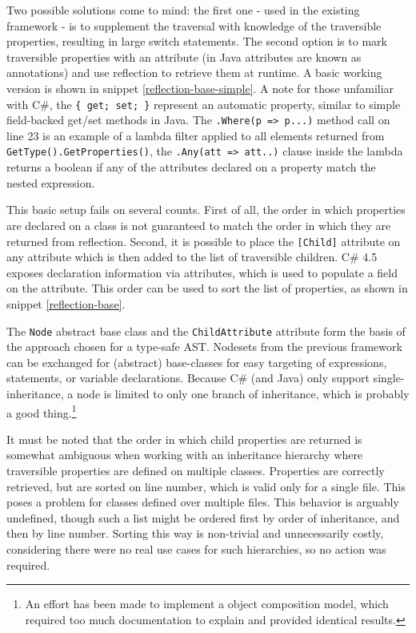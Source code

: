 \documentclass[twoside,openright]{uva-bachelor-thesis}
\newcommand{\code}[1]{\texttt{\footnotesize#1}}
\begin{document}
		Two possible solutions come to mind: the first one - used in the existing framework - is to supplement the traversal with knowledge of the traversible properties, resulting in large switch statements. The second option is to mark traversible properties with an attribute (in Java attributes are known as annotations) and use reflection to retrieve them at runtime. A basic working version is shown in snippet \ref{reflection-base-simple}. A note for those unfamiliar with C\#, the \code{\{ get; set; \}} represent an automatic property, similar to simple field-backed get/set methods in Java. The \code{.Where(p => p...)} method call on line 23 is an example of a lambda filter applied to all elements returned from \code{GetType().GetProperties()}, the \code{.Any(att => att..)} clause inside the lambda returns a boolean if any of the attributes declared on a property match the nested expression.
			
		This basic setup fails on several counts. First of all, the order in which properties are declared on a class is not guaranteed to match the order in which they are returned from reflection. Second, it is possible to place the \code{[Child]} attribute on any attribute which is then added to the list of traversible children. C\# 4.5 exposes declaration information via attributes, which is used to populate a field on the attribute. This order can be used to sort the list of properties, as shown in snippet \ref{reflection-base}.
				
		The \code{Node} abstract base class and the \code{ChildAttribute} attribute form the basis of the approach chosen for a type-safe AST. Nodesets from the previous framework can be exchanged for (abstract) base-classes for easy targeting of expressions, statements, or variable declarations. Because C\# (and Java) only support single-inheritance, a node is limited to only one branch of inheritance, which is probably a good thing.\footnote{An effort has been made to implement a object composition model, which required too much documentation to explain and provided identical results.}
	
		It must be noted that the order in which child properties are returned is somewhat ambiguous when working with an inheritance hierarchy where traversible properties are defined on multiple classes. Properties are correctly retrieved, but are sorted on line number, which is valid only for a single file. This poses a problem for classes defined over multiple files. This behavior is arguably undefined, though such a list might be ordered first by order of inheritance, and then by line number. Sorting this way is non-trivial and unnecessarily costly, considering there were no real use cases for such hierarchies, so no action was required.
					
\end{document}
